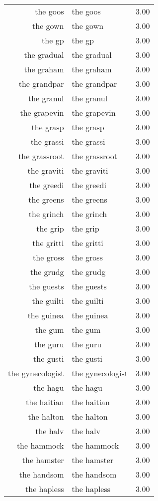 \begin{table}[ht]
\begin{tabular}{rlr}
  the goos & the goos & 3.00 \\ 
  the gown & the gown & 3.00 \\ 
  the gp & the gp & 3.00 \\ 
  the gradual & the gradual & 3.00 \\ 
  the graham & the graham & 3.00 \\ 
  the grandpar & the grandpar & 3.00 \\ 
  the granul & the granul & 3.00 \\ 
  the grapevin & the grapevin & 3.00 \\ 
  the grasp & the grasp & 3.00 \\ 
  the grassi & the grassi & 3.00 \\ 
  the grassroot & the grassroot & 3.00 \\ 
  the graviti & the graviti & 3.00 \\ 
  the greedi & the greedi & 3.00 \\ 
  the greens & the greens & 3.00 \\ 
  the grinch & the grinch & 3.00 \\ 
  the grip & the grip & 3.00 \\ 
  the gritti & the gritti & 3.00 \\ 
  the gross & the gross & 3.00 \\ 
  the grudg & the grudg & 3.00 \\ 
  the guests & the guests & 3.00 \\ 
  the guilti & the guilti & 3.00 \\ 
  the guinea & the guinea & 3.00 \\ 
  the gum & the gum & 3.00 \\ 
  the guru & the guru & 3.00 \\ 
  the gusti & the gusti & 3.00 \\ 
  the gynecologist & the gynecologist & 3.00 \\ 
  the hagu & the hagu & 3.00 \\ 
  the haitian & the haitian & 3.00 \\ 
  the halton & the halton & 3.00 \\ 
  the halv & the halv & 3.00 \\ 
  the hammock & the hammock & 3.00 \\ 
  the hamster & the hamster & 3.00 \\ 
  the handsom & the handsom & 3.00 \\ 
  the hapless & the hapless & 3.00 \\ 

\end{tabular}
\end{table}
